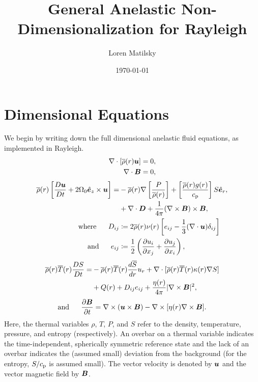 \documentclass[12pt]{article}
\date{\today}
\author{Loren Matilsky}
\title{General Anelastic Non-Dimensionalization for Rayleigh}
\numberwithin{equation}{section}
\begin{document}
	\maketitle
	\section{Dimensional Equations}
	We begin by writing down the full dimensional anelastic fluid equations, as implemented in Rayleigh.
	\begin{align}
		\nabla\cdot[\overline{\rho}(r)\bm{u}] &= 0\label{eq:contdim},\\
		\nabla\cdot \bm{B} &= 0,
	\end{align}
	\begin{subequations}\label{eq:momdim}
	\begin{align}
		\overline{\rho}(r)\left[\frac{D\bm{u}}{Dt}+2\Omega_0\hat{\bm{e}}_z\times\bm{u}\right] = &-\overline{\rho}(r)\nabla\left[ \frac{P}{\overline{\rho}(r)} \right] + \left[\frac{\overline{\rho}(r) g(r)}{c_{\rm{p}}}\right] S\hat{\bm{e}}_r, \nonumber\\
		&+\nabla\cdot\bm{D} + \frac{1}{4\pi}(\nabla\times\bm{B})\times\bm{B},\\
		\text{where}\ \ \ \ \  D_{ij} &\coloneqq 2\overline{\rho}(r)\nu(r) \left[e_{ij} - \frac{1}{3}(\nabla\cdot\bm{u}) \delta_{ij} \right]\label{eq:dstressdim}\\
		\text{and}\ \ \ \ \  e_{ij} &\coloneqq \frac{1}{2}\left(\frac{\partial u_i}{\partial x_j} + \frac{\partial u_j}{\partial x_i} \right),\label{eq:estressdim}
	\end{align}
	\end{subequations}
	\begin{align}\label{eq:endim}
		\overline{\rho}(r)\overline{T}(r) \frac{DS}{Dt} = &- \overline{\rho}(r)\overline{T}(r) \frac{d\overline{S}}{dr} u_r + \nabla\cdot[\overline{\rho}(r) \overline{T}(r) \kappa(r) \nabla S] \nonumber \\
		&+ Q(r) + D_{ij}e_{ij} + \frac{\eta(r)}{4\pi}|\nabla\times\bm{B}|^2,
	\end{align}
	\begin{align}\label{eq:inddim}
	\text{and}\ \ \ \ \  \frac{\partial\bm{B}}{\partial t} = \nabla\times(\bm{u}\times\bm{B}) - \nabla\times[\eta(r)\nabla\times\bm{B}].
	\end{align}
	Here, the thermal variables $\rho$, $T$, $P$, and $S$ refer to the density, temperature, pressure, and entropy (respectively). An overbar on a thermal variable indicates the time-independent, spherically symmetric reference state and the lack of an overbar indicates the (assumed small) deviation from the background (for the entropy, $S/c_{\rm{p}}$ is assumed small). The vector velocity is denoted by $\bm{u}$ and the vector magnetic field by $\bm{B}$. 
	
\end{document}
